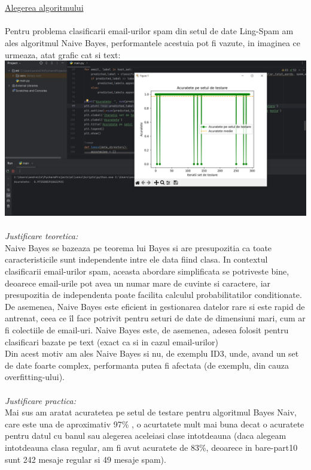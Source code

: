 \documentclass[11pt,leqno]{article}
\begin{document}
	\\\\
	{\large \underline{Alegerea algoritmului} }
	\\\\
	{\normalsize 
		Pentru problema clasificarii email-urilor spam din setul de date Ling-Spam am ales algoritmul Naive Bayes, performantele acestuia pot fi vazute, in imaginea ce urmeaza, atat grafic cat si text:\\
		\includegraphics[scale=0.5]{acuratetetestare}
		\\\\
			\textit{Justificare teoretica:}\\
			Naive Bayes se bazeaza pe teorema lui Bayes si are presupozitia ca toate caracteristicile sunt independente intre ele data fiind clasa. In contextul clasificarii email-urilor spam, aceasta abordare simplificata se potriveste bine, deoarece email-urile pot avea un numar mare de cuvinte si caractere, iar presupozitia de independenta poate facilita calculul probabilitatilor conditionate. De asemenea, Naive Bayes este eficient in gestionarea datelor rare si este rapid de antrenat, ceea ce îl face potrivit pentru seturi de date de dimensiuni mari, cum ar fi colectiile de email-uri.	Naive Bayes este, de asemenea, adesea folosit pentru clasificari bazate pe text (exact ca si in cazul email-urilor) \\
			Din acest motiv am ales Naive Bayes si nu, de exemplu ID3, unde, avand un set de date foarte complex, performanta putea fi afectata (de exemplu, din cauza overfitting-ului). 
		\\\\
		\textit{Justificare practica:}\\
		Mai sus am aratat acuratetea pe setul de testare pentru algoritmul Bayes Naiv, care este una de aproximativ 97\%
		, o acurtatete mult mai buna decat o acuratete pentru datul cu banul sau alegerea aceleiasi clase intotdeauna (daca alegeam intotdeauna clasa regular, am fi avut acuratete de 83\%, deoarece in bare-part10 sunt 242 mesaje regular si 49 mesaje spam).\\
}
\end{document}
